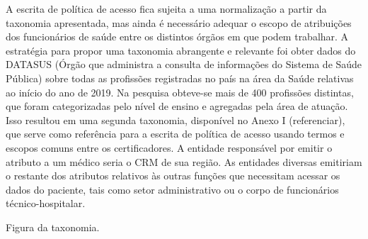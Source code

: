\documentclass[a4paper,11pt]{article}
\begin{document}
A escrita de política de acesso fica sujeita a uma normalização a partir da taxonomia apresentada, mas ainda é necessário adequar o escopo de atribuições dos funcionários de saúde entre os distintos órgãos em que podem trabalhar. A estratégia para propor uma taxonomia abrangente e relevante foi obter dados do DATASUS (Órgão que administra a consulta de informações do Sistema de Saúde Pública) sobre todas as profissões registradas no país na área da Saúde relativas ao início do ano de 2019. Na pesquisa obteve-se mais de 400 profissões distintas, que foram categorizadas pelo nível de ensino e agregadas pela área de atuação. Isso resultou em uma segunda taxonomia, disponível no Anexo I {\color{RoyalBlue}(referenciar)}, que serve como referência para a escrita de política de acesso usando termos e escopos comuns entre os certificadores. A entidade responsável por emitir o atributo a um médico seria o CRM de sua região. As entidades diversas emitiriam o restante dos atributos relativos às outras funções que necessitam acessar os dados do paciente, tais como setor administrativo ou o corpo de funcionários técnico-hospitalar. 

{\color{ForestGreen}Figura da taxonomia}. 
\end{document}
